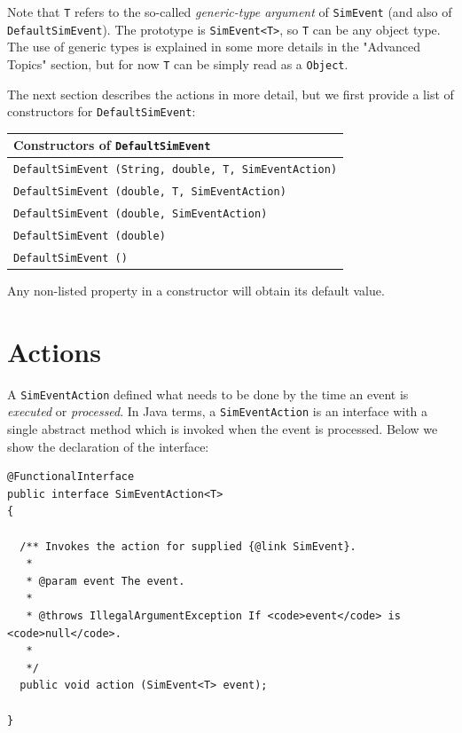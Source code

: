 \documentclass[12pt]{book}
\begin{document}
Note that \lstinline{T} refers to the so-called {\em generic-type argument\/}
  of \lstinline{SimEvent} (and also of \lstinline|DefaultSimEvent|).
The prototype is \lstinline|SimEvent<T>|, so \lstinline|T| can be any object type.
The use of generic types is explained in some more details in the "Advanced Topics" section,
  but for now \lstinline!T! can be simply read as a \lstinline{Object}.

The next section describes the actions in more detail, but we first provide a list
  of constructors for \lstinline{DefaultSimEvent}:

\begin{tabular}{|l|}
  \hline
  {\bf Constructors of \lstinline|DefaultSimEvent|} \\
  \hline
  \lstinline[basicstyle=\footnotesize]!DefaultSimEvent (String, double, T, SimEventAction)! \\
  \lstinline[basicstyle=\footnotesize]!DefaultSimEvent (double, T, SimEventAction)! \\
  \lstinline[basicstyle=\footnotesize]!DefaultSimEvent (double, SimEventAction)! \\
  \lstinline[basicstyle=\footnotesize]!DefaultSimEvent (double)! \\
  \lstinline[basicstyle=\footnotesize]!DefaultSimEvent ()! \\
  \hline
\end{tabular}

Any non-listed property in a constructor will obtain its default value.

\section{Actions}

A \lstinline{SimEventAction} defined what needs to be done by the time an event
  is {\em executed\/} or {\em processed}.
In Java terms, a \lstinline{SimEventAction} is an interface with
  a single abstract method which is invoked when the event is processed.
Below we show the declaration of the interface:
\begin{lstlisting}[basicstyle=\tiny]
@FunctionalInterface
public interface SimEventAction<T>
{

  /** Invokes the action for supplied {@link SimEvent}.
   *
   * @param event The event.
   *
   * @throws IllegalArgumentException If <code>event</code> is <code>null</code>.
   * 
   */
  public void action (SimEvent<T> event);

}
\end{lstlisting}
\end{document}
